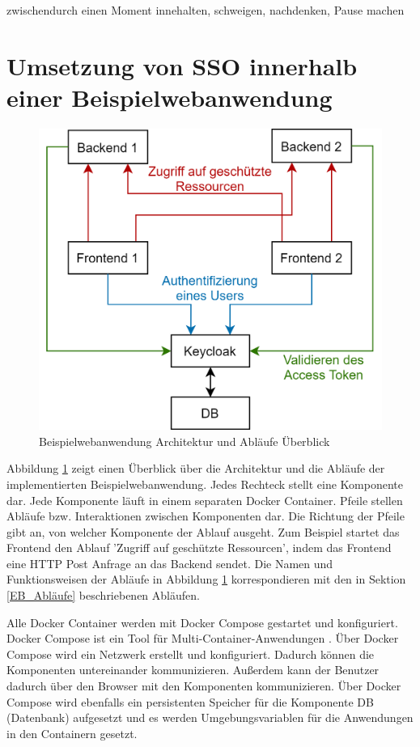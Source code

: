 zwischendurch einen Moment innehalten, schweigen, nachdenken, Pause machen



\section{Umsetzung von SSO innerhalb einer Beispielwebanwendung}


\begin{figure}[!ht]
	\centering
	\includegraphics[width=.8\textwidth]{Images/Ebert/ArchitectureDiagram.png}
	\caption{Beispielwebanwendung Architektur und Abläufe Überblick}
	\label{fig:EB_Beispielwebanwendung Architektur und Abläufe Überblick}
\end{figure}

Abbildung \ref{fig:EB_Beispielwebanwendung Architektur und Abläufe Überblick} zeigt einen Überblick über die Architektur und die Abläufe der implementierten Beispielwebanwendung. Jedes Rechteck stellt eine Komponente dar. Jede Komponente läuft in einem separaten Docker Container. Pfeile stellen Abläufe bzw. Interaktionen zwischen Komponenten dar. Die Richtung der Pfeile gibt an, von welcher Komponente der Ablauf ausgeht. Zum Beispiel startet das Frontend den Ablauf 'Zugriff auf geschützte Ressourcen', indem das Frontend eine HTTP Post Anfrage an das Backend sendet. Die Namen und Funktionsweisen der Abläufe in Abbildung \ref{fig:EB_Beispielwebanwendung Architektur und Abläufe Überblick} korrespondieren mit den in Sektion \ref{EB_Abläufe} beschriebenen Abläufen. 

Alle Docker Container werden mit Docker Compose gestartet und konfiguriert. Docker Compose ist ein Tool für Multi-Container-Anwendungen \cite{EB40}. Über Docker Compose wird ein Netzwerk erstellt und konfiguriert. Dadurch können die Komponenten untereinander kommunizieren. Außerdem kann der Benutzer dadurch über den Browser mit den Komponenten kommunizieren. Über Docker Compose wird ebenfalls ein persistenten Speicher für die Komponente DB (Datenbank) aufgesetzt und es werden Umgebungsvariablen für die Anwendungen in den Containern gesetzt.


